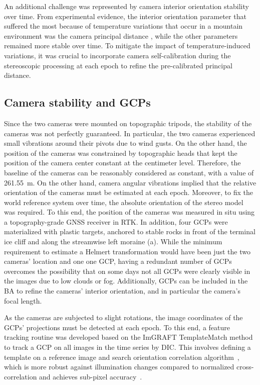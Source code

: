 An additional challenge was represented by camera interior orientation stability over
time.
From experimental evidence, the interior orientation parameter that suffered the most
because of temperature variations that occur in a mountain environment
was the camera principal distance \citep{Elias2020}, while the other parameters
remained more stable over time.
To mitigate the impact of temperature-induced variations, it was crucial to incorporate
camera self-calibration during the stereoscopic processing at each epoch to refine the
pre-calibrated principal distance.

\subsection{Camera stability and GCPs}\label{sec:4:stability}

Since the two cameras were mounted on topographic tripods, the stability of the cameras
was not perfectly guaranteed. In particular, the two cameras experienced small vibrations
around their pivots due to wind gusts.
On the other hand, the position of the cameras was constrained by topographic heads that
kept the position of the camera center constant at the centimeter level.
Therefore, the baseline of the cameras can be reasonably considered as constant, with a
value of \SI{261.55}{\meter}.
On the other hand, camera angular vibrations implied that the relative orientation of the
cameras must be estimated at each epoch.
Moreover, to fix the world reference system over time, the absolute orientation of the stereo model was required.
To this end, the position of the cameras was measured in situ using a topography-grade
GNSS receiver in RTK.
In addition, four GCPs were materialized with plastic targets, anchored to stable rocks
in front of the terminal ice cliff and along the streamwise left
moraine (a).
While the minimum requirement to estimate a Helmert transformation would have been just
the two cameras' location and one one GCP, having a redundant number of GCPs overcomes
the possibility that on some days not all GCPs were clearly visible in the images due 
to low clouds or fog.
Additionally, GCPs can be included in the BA to refine the cameras' interior
orientation, and in particular the camera's focal length.

As the cameras are subjected to slight rotations, the image coordinates of the GCPs'
projections must be detected at each epoch.
To this end, a feature tracking routine was developed based on the ImGRAFT TemplateMatch
method~\citep{Messerli2015} to track a GCP on all images in the time series by DIC. 
This involves defining a template on a reference image and search 
orientation correlation algorithm~\citep{fitch2002_OC}, which is more robust against illumination changes compared to normalized cross-correlation and achieves sub-pixel accuracy~\citep{Dematteis2021, Heid2012_evaluation_xcorr}.

